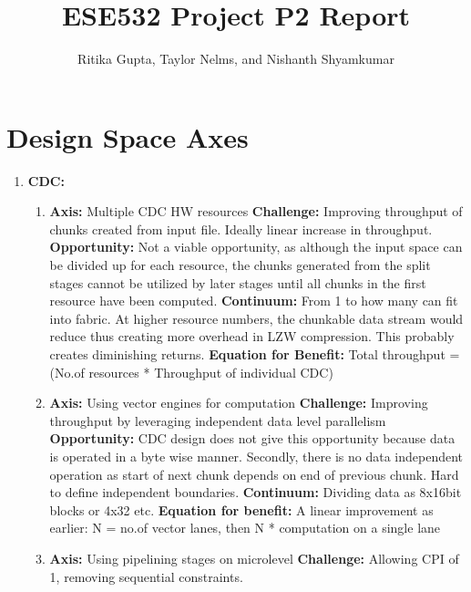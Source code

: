 \documentclass{article}
\title{ESE532 Project P2 Report}
\author{Ritika Gupta, Taylor Nelms, and Nishanth Shyamkumar}
\begin{document}
\maketitle


\section{Design Space Axes}
\begin{enumerate}
\item%
\textbf{CDC:}
\begin{enumerate}
\item%
\textbf{Axis:} Multiple CDC HW resources
\newline
\textbf{Challenge:} Improving throughput of chunks created from input file. Ideally linear increase in throughput. 
\newline
\textbf{Opportunity:} Not a viable opportunity, as although the input space can be divided up for each resource, the chunks generated from the split stages cannot be utilized by later stages until all chunks in the first resource have been computed.
\newline
\textbf{Continuum:} From 1 to how many can fit into fabric. At higher resource numbers, the chunkable data stream would reduce thus creating more overhead in LZW compression. This probably creates diminishing returns.
\newline
\textbf{Equation for Benefit:} Total throughput = (No.of resources * Throughput of individual CDC)
\item%
\textbf{Axis:} Using vector engines for computation
\newline
\textbf{Challenge: } Improving throughput by leveraging independent data level parallelism
\newline
\textbf{Opportunity: } CDC design does not give this opportunity because data is operated in a byte wise manner. Secondly, there is no data independent operation as start of next chunk depends on end of previous chunk. Hard to define independent boundaries.
\newline
\textbf{Continuum:} Dividing data as 8x16bit blocks or 4x32 etc. 
\newline
\textbf{Equation for benefit:} A linear improvement as earlier:
\newline
N = no.of vector lanes, then N * computation on a single lane
\item%
\textbf{Axis:} Using pipelining stages on microlevel
\newline
\textbf{Challenge:} Allowing CPI of 1, removing sequential constraints.

\end{enumerate}
\end{enumerate}
\end{document}
